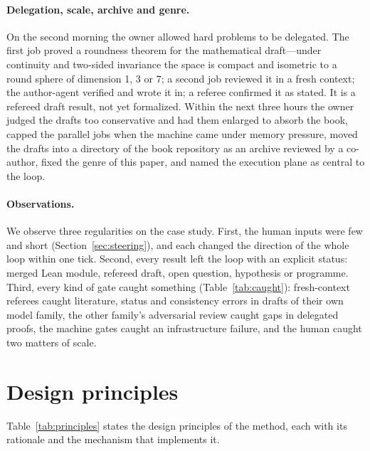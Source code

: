 \documentclass[11pt]{article}
\newcommand{\code}[1]{\texttt{\detokenize{#1}}}
\begin{document}
\paragraph{Delegation, scale, archive and genre.} On the second morning the
owner allowed hard problems to be delegated. The first job proved a
roundness theorem for the mathematical draft---under continuity and
two-sided invariance the space is compact and isometric to a round sphere of
dimension 1, 3 or 7; a second job reviewed it in a fresh context; the
author-agent verified and wrote it in; a referee confirmed it as stated. It is
a refereed draft result, not yet formalized. Within the next three hours the
owner judged the drafts too conservative and had them enlarged to absorb the
book, capped the parallel jobs when the machine came under memory pressure,
moved the drafts into a \code{paper/} directory of the book repository as an
archive reviewed by a co-author, fixed the genre of this paper, and named the
execution plane as central to the loop.

\paragraph{Observations.} We observe three regularities on the case study.
First, the human inputs were few and short (Section~\ref{sec:steering}), and
each changed the direction of the whole loop within one tick. Second, every
result left the loop with an explicit status: merged Lean module, refereed
draft, open question, hypothesis or programme. Third, every kind of gate
caught something (Table~\ref{tab:caught}): fresh-context referees caught
literature, status and consistency errors in drafts of their own model
family, the other family's adversarial review caught gaps in delegated
proofs, the machine gates caught an infrastructure failure, and the human
caught two matters of scale.

\section{Design principles}
\label{sec:lessons}
Table~\ref{tab:principles} states the design principles of the method, each
with its rationale and the mechanism that implements it.
\end{document}
